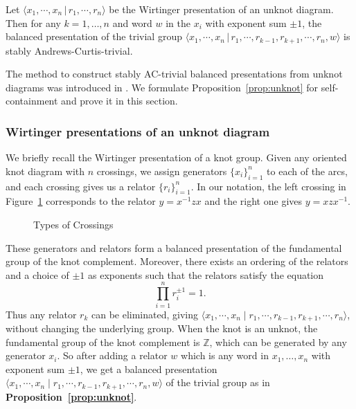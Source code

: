 \begin{proposition}\label{prop:unknot}
    Let $\langle x_1,\cdots, x_n\, |\, r_1, \cdots, r_n \rangle$ be the Wirtinger presentation of an unknot diagram. Then for any $k=1,\ldots,n$ and word $w$ in the $x_i$ with exponent sum $\pm 1$, the balanced presentation of the trivial group $\langle x_1,\cdots, x_n\,|\, r_1,\cdots, r_{k-1}, r_{k+1},\cdots, r_n, w\rangle$ is stably Andrews-Curtis-trivial.
\end{proposition}
\begin{remark}
The method to construct stably AC-trivial balanced presentations from unknot diagrams was introduced in \cite{MMS}.  We formulate Proposition~\ref{prop:unknot} for self-containment and prove it in this section.
\end{remark}

\subsubsection{Wirtinger presentations of an unknot diagram}
We briefly recall the Wirtinger presentation of a knot group. Given any oriented knot diagram with $n$ crossings, we assign generators $\{x_i\}_{i=1}^n$ to each of the arcs, and each crossing gives us a relator $\{r_i\}_{i=1}^n$. In our notation, the left crossing in Figure~\ref{fig:wp} corresponds to the relator $y=x^{-1}zx$ and the right one gives $y=xzx^{-1}$.

\begin{figure}
    \centering
{}
    \caption{Types of Crossings}
    \label{fig:wp}
\end{figure}
These generators and relators form a balanced presentation of the fundamental group of the knot complement. Moreover, there exists an ordering of the relators and a choice of $\pm 1$ as exponents such that the relators satisfy the equation
$$\prod_{i=1}^nr_i^{\pm1}=1.
$$
Thus any relator $r_k$ can be eliminated, giving $\langle x_1,\cdots,x_n\mid r_1,\cdots,r_{k-1},r_{k+1},\cdots,r_n\rangle$, without changing the underlying group. When the knot is an unknot, the fundamental group of the knot complement is $\mathbb{Z}$, which can be generated by any generator $x_i$. So after adding a relator $w$ which is any word in $x_1,\ldots,x_n$ with exponent sum $\pm1$, we get a balanced presentation $\langle x_1,\cdots,x_n\mid r_1,\cdots,r_{k-1},r_{k+1},\cdots,r_n,w\rangle$ of the trivial group as in \textbf{Proposition~\ref{prop:unknot}}.

